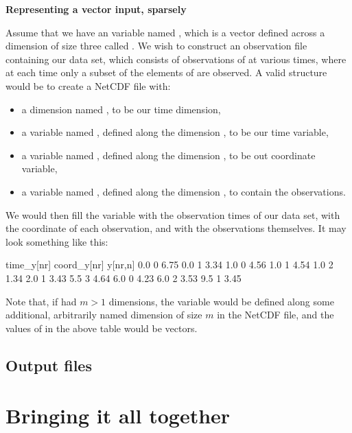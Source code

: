 \begin{example}
\noindent \textbf{Representing a vector input, sparsely}

Assume that we have an  variable named , which is a vector
defined across a dimension of size three called . We wish to construct
an observation file containing our data set, which consists of observations of
 at various times, where at each time only a subset of the elements of
 are observed. A valid structure would be to create a NetCDF file
with:
\begin{itemize}
\item a dimension named , to be our time dimension,
\item a variable named , defined along the dimension ,
  to be our time variable,
\item a variable named , defined along the dimension ,
  to be out coordinate variable,
\item a variable named , defined along the dimension , to
  contain the observations.
\end{itemize}
We would then fill the variable  with the observation times of
our data set,  with the coordinate of each observation, and
 with the observations themselves. It may look something like this:

\begin{cmdcode}
time_y[nr]    coord_y[nr]    y[nr,n]
       0.0             0       6.75
       0.0             1       3.34
       1.0             0       4.56
       1.0             1       4.54
       1.0             2       1.34
       2.0             1       3.43
       5.5             3       4.64
       6.0             0       4.23
       6.0             2       3.53
       9.5             1       3.45
\end{cmdcode}

Note that, if  had $m > 1$ dimensions, the 
variable would be defined along some additional, arbitrarily named dimension
of size $m$ in the NetCDF file, and the values of  in the above
table would be vectors.
\end{example}

\subsection{Output files}

\section{Bringing it all together\label{Bringing_it_all_together}}

